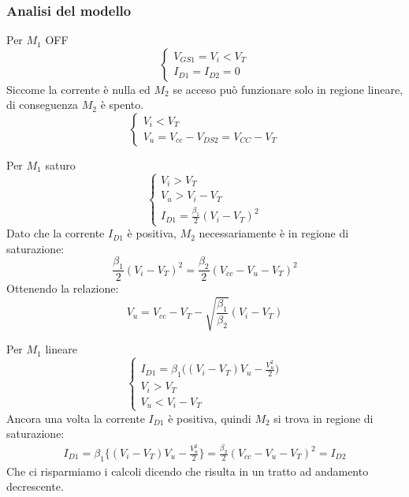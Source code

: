 \documentclass[../template]{subfiles}
\begin{document}
\subsubsection{Analisi del modello}
\begin{tcolorbox}
    Per $M_1$ OFF
    \[
        \begin{cases}
            V_{GS1} = V_i < V_T
            \\
            I_{D1} = I_{D2} = 0
        \end{cases}
    \]
    Siccome la corrente è nulla ed $M_2$ se acceso può funzionare solo in regione lineare, di conseguenza $M_2$ è spento.
    \[\begin{cases}
        V_i < V_T \\
        V_u = V_{cc} - V_{DS2} = V_{CC} - V_T
    \end{cases}\]
\end{tcolorbox}
\begin{tcolorbox}
    Per $M_1$ saturo
    \[\begin{cases}
        V_i > V_T
        \\
        V_u > V_i - V_T
        \\
        I_{D1} = \frac{\beta_1}{2}(V_i - V_T)^2
    \end{cases}\]
    Dato che la corrente $I_{D1}$ è positiva, $M_2$ necessariamente è in regione di saturazione:
    \[
        \frac{\beta_1}{2}(V_i - V_T)^2 = \frac{\beta_2}{2}(V_{cc} - V_u - V_T)^2
    \]
    Ottenendo la relazione:
    \[
        V_u = V_{cc} - V_T - \sqrt{\frac{\beta_1}{\beta_2}} (V_i - V_T)
    \]
\end{tcolorbox}
\begin{tcolorbox}
    Per $M_1$ lineare
    \[
        \begin{cases}
            I_{D1} = \beta_1 \big((V_i - V_T) V_u - \frac{V_u^2}{2}\big)
            \\
            V_i > V_T
            \\
            V_u < V_i - V_T
        \end{cases}
    \]
    Ancora una volta la corrente $I_{D1}$ è positiva, quindi $M_2$ si trova in regione di saturazione:
    \begin{align*}
        I_{D1} = \beta_1 \big\{ (V_i - V_T) V_u - \frac{V_u^2}{2}\big\}
        = \frac{\beta_2}{2} (V_{cc} - V_u - V_T )^2 = I_{D2}
    \end{align*}
    Che ci risparmiamo i calcoli dicendo che risulta in un tratto ad andamento decrescente.
\end{tcolorbox}
\begin{center}
\end{center}
\end{document}
